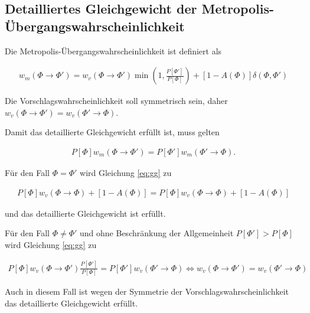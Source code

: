 \documentclass[10pt,a4paper]{article}
\begin{document}
\subsection{Detailliertes Gleichgewicht der Metropolis-Übergangswahrscheinlichkeit}
Die Metropolis-Übergangswahrscheinlichkeit ist definiert als

\begin{align*}
	w_m(\Phi\to\Phi') = w_v(\Phi\to\Phi') \min \left(1,\frac{P[\Phi']}{P[\Phi]}\right) + [1-A(\Phi)]\delta(\Phi,\Phi')
\end{align*}

Die Vorschlagswahrscheinlichkeit soll symmetrisch sein, daher $w_v(\Phi\to\Phi')=w_v(\Phi'\to\Phi)$.

Damit das detaillierte Gleichgewicht erfüllt ist, muss gelten

\begin{align}\label{eq:gg}
P[\Phi] w_m(\Phi\to\Phi')= P[\Phi']w_m(\Phi'\to\Phi).
\end{align}

Für den Fall $\Phi = \Phi'$ wird Gleichung \ref{eq:gg} zu

\begin{align*}
	P[\Phi] w_v(\Phi\to\Phi) + [1-A(\Phi)] = P[\Phi] w_v(\Phi\to\Phi) + [1-A(\Phi)]
\end{align*}

und das detaillierte Gleichgewicht ist erfüllt.

Für den Fall $\Phi \neq \Phi'$ und ohne Beschränkung der Allgemeinheit $P[\Phi']>P[\Phi]$ wird Gleichung \ref{eq:gg} zu

\begin{align*}
		P[\Phi] w_v(\Phi\to\Phi') \frac{P[\Phi']}{P[\Phi]} = P[\Phi'] w_v(\Phi'\to\Phi)
		\Leftrightarrow w_v(\Phi\to\Phi')=w_v(\Phi'\to\Phi)
\end{align*}

Auch in diesem Fall ist wegen der Symmetrie der Vorschlagswahrscheinlichkeit das detaillierte Gleichgewicht erfüllt.
\end{document}
